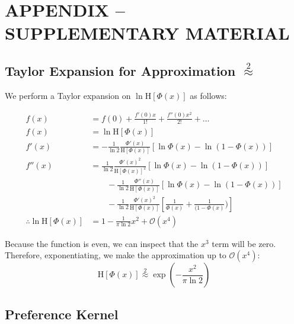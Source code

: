 \documentclass[twoside]{article}
\newcommand{\rmH}{\mathrm{H}}
\begin{document}
{


}

\newpage
\section*{APPENDIX -- SUPPLEMENTARY MATERIAL}

\subsection*{Taylor Expansion for Approximation  $\stackrel{2}{\approx}$}

We perform a Taylor expansion on $ \ln \rmH[\Phi(x)]$ as follows:

\begin{align}
f(x) &= f(0) + \frac{f'(0)x}{1!} + \frac{f''(0)x^2}{2!} + \dots \nonumber \\
f(x) &= \ln \rmH[\Phi(x)] \nonumber \\
f'(x) &= -\frac{1}{\ln 2}\frac{\Phi'(x)}{\rmH[\Phi(x)]}\left[\ln\Phi(x) - \ln(1-\Phi(x))  \right] \nonumber \\ 
f''(x) &= \frac{1}{\ln 2}\frac{\Phi'(x)^2}{\rmH[\Phi(x)]^2}\left[\ln\Phi(x) - \ln(1-\Phi(x))  \right]\nonumber\\
& \qquad - \frac{1}{\ln 2}\frac{\Phi''(x)}{\rmH[\Phi(x)]}\left[\ln\Phi(x) - \ln(1-\Phi(x))  \right] \nonumber\\
& \qquad - \frac{1}{\ln 2}\frac{\Phi'(x)^2}{\rmH[\Phi(x)]}\left[\frac{1}{\Phi(x)} + \frac{1}{(1-\Phi(x)})  \right] \nonumber\\
\therefore \ln \rmH[\Phi(x)] \nonumber  &= 1 - \frac{1}{\pi\ln2}x^2 + \mathcal{O}(x^4)
\end{align}

Because the function is even, we can inspect that the $x^3$ term will be zero. Therefore, exponentiating, we make the approximation up to $\mathcal{O}(x^4)$: $$\rmH[\Phi(x)]\stackrel{2}{\approx}\exp\left({-\frac{x^2}{\pi\ln2}}\right) $$

\subsection*{Preference Kernel}
\end{document}
